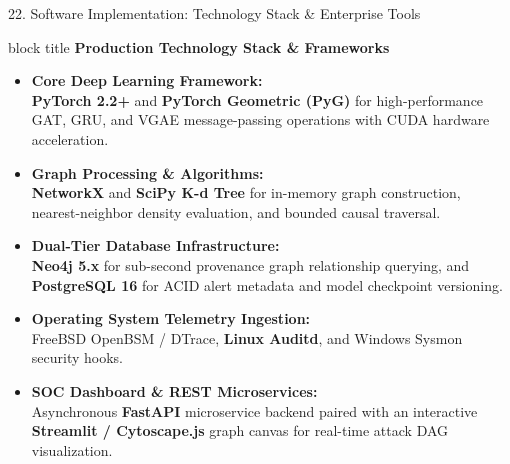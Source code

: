 \documentclass[aspectratio=169,10pt]{beamer}
\begin{document}
\begin{frame}{22. Software Implementation: Technology Stack \& Enterprise Tools}
\vspace{0.15em}
\begin{beamercolorbox}[rounded=true,shadow=false,sep=0.35em,wd=\textwidth]{block title}
\textbf{\scriptsize Production Technology Stack \& Frameworks}
\end{beamercolorbox}
\vspace{0.15em}
{\fontsize{7.5pt}{10.8pt}\selectfont
\begin{itemize}\itemsep0.25em
  \item \textbf{Core Deep Learning Framework:}\\
  \textbf{PyTorch 2.2+} and \textbf{PyTorch Geometric (PyG)} for high-performance GAT, GRU, and VGAE message-passing operations with CUDA hardware acceleration.
  \item \textbf{Graph Processing \& Algorithms:}\\
  \textbf{NetworkX} and \textbf{SciPy K-d Tree} for in-memory graph construction, nearest-neighbor density evaluation, and bounded causal traversal.
  \item \textbf{Dual-Tier Database Infrastructure:}\\
  \textbf{Neo4j 5.x} for sub-second provenance graph relationship querying, and \textbf{PostgreSQL 16} for ACID alert metadata and model checkpoint versioning.
  \item \textbf{Operating System Telemetry Ingestion:}\\
  FreeBSD OpenBSM / DTrace, \textbf{Linux Auditd}, and Windows Sysmon security hooks.
  \item \textbf{SOC Dashboard \& REST Microservices:}\\
  Asynchronous \textbf{FastAPI} microservice backend paired with an interactive \textbf{Streamlit / Cytoscape.js} graph canvas for real-time attack DAG visualization.
\end{itemize}
}
\end{frame}
\end{document}
